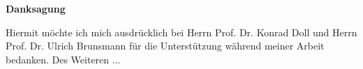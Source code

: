 \vspace*{0.5cm}
\begin{center}
   \huge{\textbf{Danksagung}}
\end{center}

\thispagestyle{empty}
\vspace{3cm}

Hiermit möchte ich mich ausdrücklich bei Herrn Prof. Dr. Konrad Doll und Herrn Prof. Dr. Ulrich Brunsmann für die Unterstützung während meiner Arbeit bedanken. Des Weiteren ...